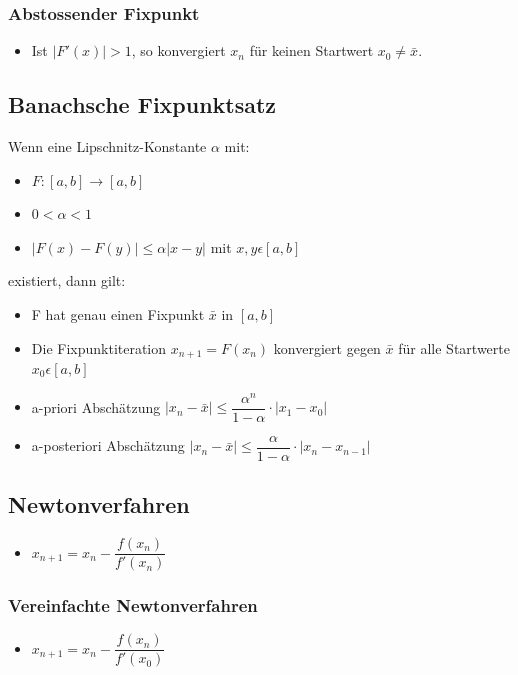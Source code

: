 \documentclass[8pt,a4paper]{scrartcl}
\begin{document}
\begin{multicols*}{3}
			\subsubsection{Abstossender Fixpunkt}
			\begin{itemize}\itemsep0pt	
					\item Ist $|F'(x)| > 1$, so konvergiert $x_{n}$ für keinen Startwert $x_{0}\neq \bar{x}$.
			\end{itemize}

		\subsection{Banachsche Fixpunktsatz}
			Wenn eine Lipschnitz-Konstante $\alpha$ mit:
			
			\begin{itemize}\itemsep0pt	
				\item $F: [a,b] \rightarrow [a,b]$
				\item $0<\alpha <1$
				\item $|F(x) - F(y)| \leq \alpha |x-y|$ mit $x,y \epsilon [a,b]$
			\end{itemize}
			
			 existiert, dann gilt:
			 
			 \begin{itemize}\itemsep0pt	
				\item F hat genau einen Fixpunkt $\bar{x}$ in $[a,b]$
				\item Die Fixpunktiteration $x_{n+1} = F(x_{n})$ konvergiert gegen $\bar{x}$ für alle Startwerte $x_{0} \epsilon [a,b]$
				\item a-priori Abschätzung $|x_{n} - \bar{x}| \leq \dfrac{\alpha^{n}}{1-\alpha}\cdot |x_{1}-x_{0}|$ 
				\item a-posteriori Abschätzung $|x_{n} - \bar{x}| \leq \dfrac{\alpha}{1-\alpha}\cdot |x_{n}-x_{n-1}|$ 
			\end{itemize}
			 
			 
		\subsection{Newtonverfahren}
			\begin{itemize}\itemsep0pt	
				\item $x_{n+1} = x_{n} - \dfrac{f(x_{n})}{f'(x_{n})}$
			\end{itemize}
			\subsubsection{Vereinfachte Newtonverfahren}
				\begin{itemize}\itemsep0pt	
					\item $x_{n+1} = x_{n} - \dfrac{f(x_{n})}{f'(x_{0})}$
				\end{itemize}

\end{multicols*}
\end{document}
